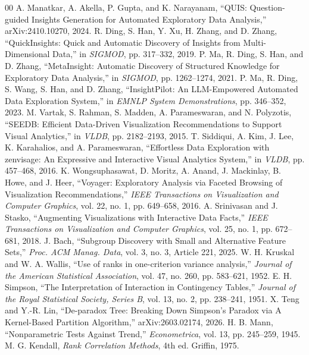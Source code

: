 \documentclass[conference]{IEEEtran}
\begin{document}
\begin{thebibliography}{00}
 A. Manatkar, A. Akella, P. Gupta, and K. Narayanam, ``QUIS: Question-guided Insights Generation for Automated Exploratory Data Analysis,'' arXiv:2410.10270, 2024.
 R. Ding, S. Han, Y. Xu, H. Zhang, and D. Zhang, ``QuickInsights: Quick and Automatic Discovery of Insights from Multi-Dimensional Data,'' in \textit{SIGMOD}, pp. 317--332, 2019.
 P. Ma, R. Ding, S. Han, and D. Zhang, ``MetaInsight: Automatic Discovery of Structured Knowledge for Exploratory Data Analysis,'' in \textit{SIGMOD}, pp. 1262--1274, 2021.
 P. Ma, R. Ding, S. Wang, S. Han, and D. Zhang, ``InsightPilot: An LLM-Empowered Automated Data Exploration System,'' in \textit{EMNLP System Demonstrations}, pp. 346--352, 2023.
 M. Vartak, S. Rahman, S. Madden, A. Parameswaran, and N. Polyzotis, ``SEEDB: Efficient Data-Driven Visualization Recommendations to Support Visual Analytics,'' in \textit{VLDB}, pp. 2182--2193, 2015.
 T. Siddiqui, A. Kim, J. Lee, K. Karahalios, and A. Parameswaran, ``Effortless Data Exploration with zenvisage: An Expressive and Interactive Visual Analytics System,'' in \textit{VLDB}, pp. 457--468, 2016.
 K. Wongsuphasawat, D. Moritz, A. Anand, J. Mackinlay, B. Howe, and J. Heer, ``Voyager: Exploratory Analysis via Faceted Browsing of Visualization Recommendations,'' \textit{IEEE Transactions on Visualization and Computer Graphics}, vol. 22, no. 1, pp. 649--658, 2016.
 A. Srinivasan and J. Stasko, ``Augmenting Visualizations with Interactive Data Facts,'' \textit{IEEE Transactions on Visualization and Computer Graphics}, vol. 25, no. 1, pp. 672--681, 2018.
 J. Bach, ``Subgroup Discovery with Small and Alternative Feature Sets,'' \textit{Proc. ACM Manag. Data}, vol. 3, no. 3, Article 221, 2025.
 W. H. Kruskal and W. A. Wallis, ``Use of ranks in one-criterion variance analysis,'' \textit{Journal of the American Statistical Association}, vol. 47, no. 260, pp. 583--621, 1952.
 E. H. Simpson, ``The Interpretation of Interaction in Contingency Tables,'' \textit{Journal of the Royal Statistical Society, Series B}, vol. 13, no. 2, pp. 238--241, 1951.
 X. Teng and Y.-R. Lin, ``De-paradox Tree: Breaking Down Simpson's Paradox via A Kernel-Based Partition Algorithm,'' arXiv:2603.02174, 2026.
 H. B. Mann, ``Nonparametric Tests Against Trend,'' \textit{Econometrica}, vol. 13, pp. 245--259, 1945.
 M. G. Kendall, \textit{Rank Correlation Methods}, 4th ed. Griffin, 1975.

\end{thebibliography}
\end{document}
